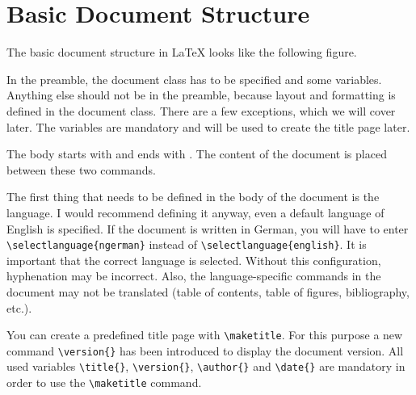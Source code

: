 \section{Basic Document Structure}

The basic document structure in \LaTeX{} looks like the following figure.


In the preamble, the document class has to be specified and some variables. Anything else should not be in the preamble, because layout and formatting is defined in the document class. There are a few exceptions, which we will cover later. The variables are mandatory and will be used to create the title page later.

The body starts with \Verb|| and ends with \Verb||. The content of the document is placed between these two commands.

The first thing that needs to be defined in the body of the document is the language. I would recommend defining it anyway, even a default language of English is specified. If the document is written in German, you will have to enter \Verb|| instead of \Verb||. It is important that the correct language is selected. Without this configuration, hyphenation may be incorrect. Also, the language-specific commands in the document may not be translated (table of contents, table of figures, bibliography, etc.).

You can create a predefined title page with \Verb|\maketitle|. For this purpose a new command \Verb|\version{}| has been introduced to display the document version.  All used variables \Verb|\title{}|, \Verb|\version{}|, \Verb|\author{}| and \Verb|\date{}| are mandatory in order to use the \Verb|\maketitle| command.

